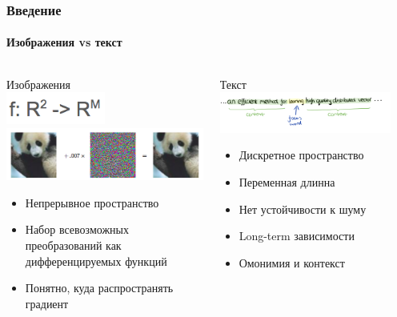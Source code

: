 \documentclass[10pt]{beamer}
\begin{document}
\begin{frame}
\frametitle{Введение}
\framesubtitle{Изображения vs текст}

\begin{columns}[T]
    \begin{column}[T]{0.5\textwidth}
        \begin{center}
            Изображения \\
            \includegraphics[width=0.5\textwidth]{images/image_as_func.png} \\
            \includegraphics[width=\textwidth]{images/panda_plus_noise.png} \\
            \begin{itemize}
                \item Непрерывное пространство
                \item Набор всевозможных преобразований как дифференцируемых функций
                \item Понятно, куда распространять градиент
            \end{itemize}
        \end{center}
    \end{column}
    \vline
    \begin{column}[T]{0.5\textwidth}
        \begin{center}
            Текст \\
            \includegraphics[width=0.9\textwidth]{images/word_context.png} \\
            \begin{itemize}
                \item Дискретное пространство
                \item Переменная длинна
                \item Нет устойчивости к шуму
                \item Long-term зависимости
                \item Омонимия и контекст
            \end{itemize}
        \end{center}
    \end{column}
\end{columns}

\end{frame}
\end{document}
